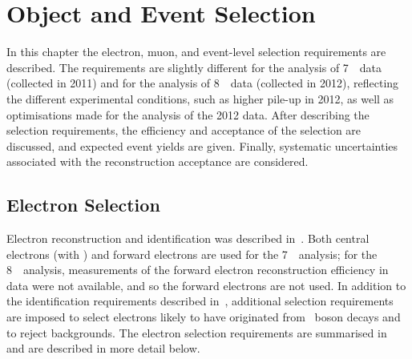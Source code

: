 \graphicspath{{Chapters/ObjEventSelection/Figures/}}
\chapter{Object and Event Selection}
\label{chap:ObjEventSelection}

In this chapter the electron, muon, and event-level selection requirements are described. 
The requirements are
slightly different for the analysis of 7~\tev\ data (collected in 2011) and for
the analysis of 8~\tev\ data (collected in 2012),
reflecting the different experimental conditions, such as higher pile-up in
2012, as well as optimisations made for the analysis of the 2012 data. After
describing the selection requirements, the efficiency and acceptance of the
selection are discussed, and expected event yields are given. Finally, systematic
uncertainties associated with the reconstruction acceptance are considered.

\section{Electron Selection}
\label{sec:objsel-el}

Electron reconstruction and identification was described in~. Both
central electrons 
(with ) 
and forward electrons are used for the 7~\tev\ analysis; for the 8~\tev\
analysis,
measurements of the forward electron reconstruction efficiency in data were
not available, and so the forward electrons are not used. In
addition to the identification requirements described in~,
additional selection requirements are imposed to select electrons likely to have
originated from \Z\ boson decays and to reject backgrounds. 
The electron selection requirements
are summarised in~ and are described in more detail below. 

